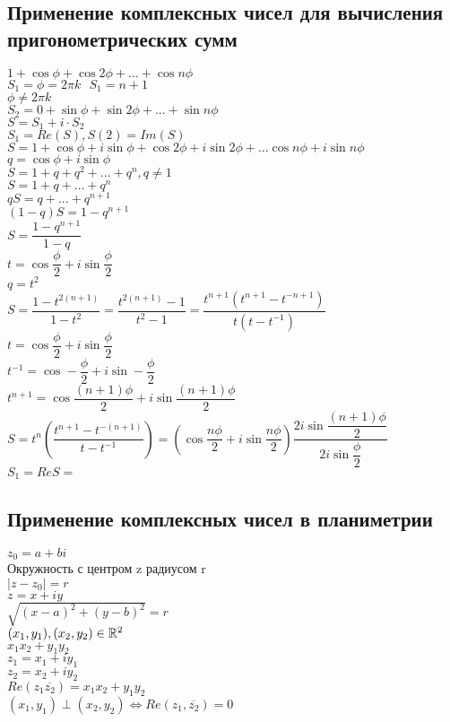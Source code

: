\subsection{Применение комплексных чисел для вычисления пригонометрических сумм} 

$ 1 + \cos \phi + \cos 2\phi + ... + \cos n \phi $ \\
$ S_1 = \phi = 2 \pi k \ \ \ S_1 = n + 1 $ \\
$ \phi \neq 2 \pi k $ \\
$ S_2 = 0 + \sin \phi + \sin 2\phi + ... + \sin n \phi $ \\
$ S = S_1 + i \cdot S_2 $\\
$ S_1 = Re(S) , S(2) = Im(S) $ \\
$ S  = 1 + \cos \phi + i \sin \phi + \cos 2\phi +  i \sin 2\phi + ... \cos n \phi + i \sin n \phi $ \\
$ q = \cos \phi + i \sin \phi $ \\
$ S = 1 + q + q^2 + ... + q^n , q \neq 1 $\\
$ S = 1 + q + ... + q^n $ \\
$ qS = q + ... + q^{n+1} $ \\
$ (1-q) S = 1 - q^{n+1} $ \\
$ S = \dfrac{1 - q^{n+1}}{1 - q} $ \\
$ t = \cos \dfrac{\phi}{2} + i \sin \dfrac{\phi}{2} $ \\
$ q = t^2 $ \\
$ S = \dfrac{1- t^{2(n+1)}}{1-t^2} = \dfrac{t^{2(n+1)} - 1}{t^2 - 1} = \dfrac{t^{n+1} ( t^{n+1} - t^{-n+1} )}{t(t - t^{-1})} $ \\
$ t = \cos \dfrac{\phi}{2} + i \sin \dfrac{\phi}{2} $ \\
$ t^{-1} = \cos -\dfrac{\phi}{2} + i \sin -\dfrac{\phi}{2} $ \\
$ t^{n+1} = \cos \dfrac{(n+1)\phi}{2} + i \sin \dfrac{(n+1)\phi}{2} $ \\
$ S = t^n \left( \dfrac{t^{n+1} - t^{-(n+1)}}{t - t^{-1}} \right) = \left( \cos \dfrac{n\phi}{2} + i \sin \dfrac{n\phi}{2} \right) \dfrac{2i \sin \dfrac{(n+1) \phi }{2}}{2i \sin \dfrac{\phi}{2}} $\\
$ S_1 = ReS = $%
\subsection{Применение комплексных чисел в планиметрии} 
$ z_0 = a + bi $ \\
Окружность с центром z радиусом r \\
$ |z - z_0 | = r$ \\
$ z =  x + iy  $ \\
$ \sqrt{(x-a)^2 + (y-b)^2} = r$ \\
$ (x_1, y_1), (x_2, y_2) \in \mathbb{R}^2 $ \\
$ x_1x_2 + y_1y_2 $ \\
$ z_1 = x_1 + iy_1 $ \\
$ z_2 = x_2 + i y_2 $\\
$ Re(z_1 \overline{z_2}) = x_1x_2 + y_1y_2 $\\
$ (x_1, y_1) \perp (x_2, y_2) \Leftrightarrow Re(z_1, \overline{z_2}) = 0 $\\

